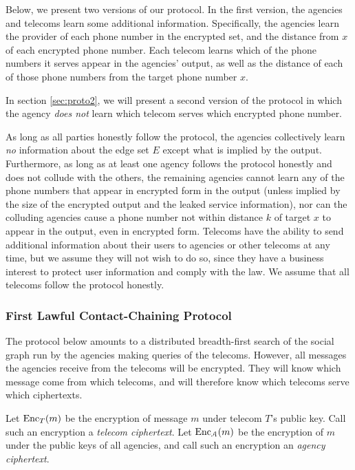 Below, we present two versions of our protocol. In the first version, the agencies and telecoms learn some additional information. Specifically, the agencies learn the provider of each phone number in the encrypted set, and the distance from $x$ of each encrypted phone number. Each telecom learns which of the phone numbers it serves appear in the agencies' output, as well as the distance of each of those phone numbers from the target phone number $x$.



In section \ref{sec:proto2}, we will present a second version of the protocol in which the agency \emph{does not} learn which telecom serves which encrypted phone number.



As long as all parties honestly follow the protocol, the agencies collectively learn \emph{no} information about the edge set $E$ except what is implied by the output. Furthermore, as long as at least one agency follows the protocol honestly and does not collude with the others, the remaining agencies cannot learn any of the phone numbers that appear in encrypted form in the output (unless implied by the size of the encrypted output and the leaked service information), nor can the colluding agencies cause a phone number not within distance $k$ of target $x$ to appear in the output, even in encrypted form. Telecoms have the ability to send additional information about their users to agencies or other telecoms at any time, but we assume they will not wish to do so, since they have a business interest to protect user information and comply with the law. We assume that all telecoms follow the protocol honestly.



\subsubsection{First Lawful Contact-Chaining Protocol}

\label{sec:proto1}



The protocol below amounts to a distributed breadth-first search of the social graph run by the agencies making queries of the telecoms. However, all messages the agencies receive from the telecoms will be encrypted. They will know which message come from which telecoms, and will therefore know which telecoms serve which ciphertexts.



Let $\operatorname{Enc}_T(m)$ be the encryption of message $m$ under telecom $T$'s public key. Call such an encryption a \emph{telecom ciphertext}. Let $\operatorname{Enc}_\mathcal{A}(m)$ be the encryption of $m$ under the public keys of all agencies, and call such an encryption an \emph{agency ciphertext}.



